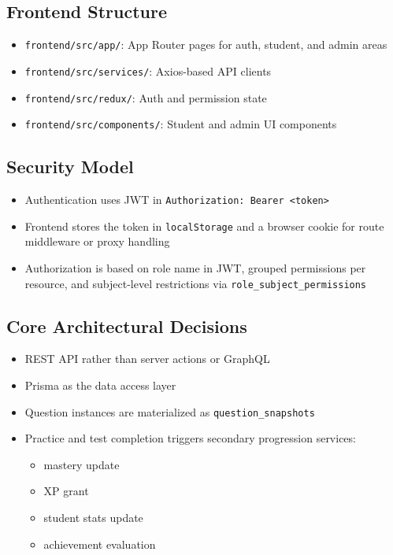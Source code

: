 \documentclass[11pt,a4paper]{article}
\newcommand{\docpath}[1]{\texttt{#1}}
\begin{document}
\subsection{Frontend Structure}

\begin{itemize}[leftmargin=1.5em]
  \item \docpath{frontend/src/app/}: App Router pages for auth, student, and admin areas
  \item \docpath{frontend/src/services/}: Axios-based API clients
  \item \docpath{frontend/src/redux/}: Auth and permission state
  \item \docpath{frontend/src/components/}: Student and admin UI components
\end{itemize}

\subsection{Security Model}

\begin{itemize}[leftmargin=1.5em]
  \item Authentication uses JWT in \docpath{Authorization: Bearer <token>}
  \item Frontend stores the token in \docpath{localStorage} and a browser cookie for route middleware or proxy handling
  \item Authorization is based on role name in JWT, grouped permissions per resource, and subject-level restrictions via \docpath{role\_subject\_permissions}
\end{itemize}

\subsection{Core Architectural Decisions}

\begin{itemize}[leftmargin=1.5em]
  \item REST API rather than server actions or GraphQL
  \item Prisma as the data access layer
  \item Question instances are materialized as \docpath{question\_snapshots}
  \item Practice and test completion triggers secondary progression services:
  \begin{itemize}[leftmargin=2em]
    \item mastery update
    \item XP grant
    \item student stats update
    \item achievement evaluation
  \end{itemize}
\end{itemize}
\end{document}
